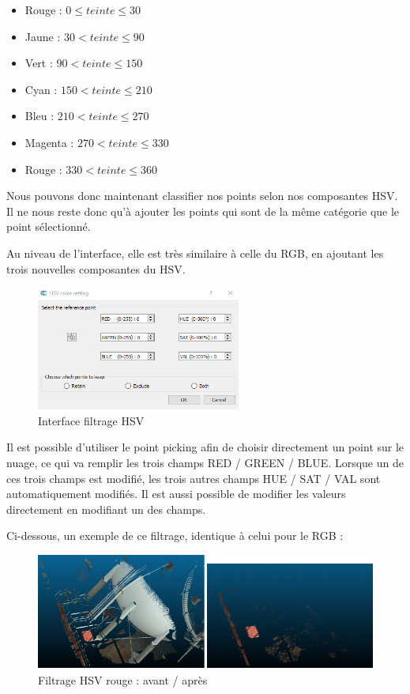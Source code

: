 \documentclass[12pt,titlepage,french]{article}
\begin{document}
\begin{itemize}
    \item Rouge : $0 \leq teinte \leq 30$
    \item Jaune : $30 < teinte \leq 90$
    \item Vert : $90 < teinte \leq 150$
    \item Cyan : $150 < teinte \leq 210$
    \item Bleu : $210 < teinte \leq 270$
    \item Magenta : $270 < teinte \leq 330$
    \item Rouge : $330 < teinte \leq 360$ \newline
\end{itemize}

Nous pouvons donc maintenant classifier nos points selon nos composantes HSV. Il ne nous reste donc qu'à ajouter les points qui sont de la même catégorie que le point sélectionné. \newline

Au niveau de l'interface, elle est très similaire à celle du RGB, en ajoutant les trois nouvelles composantes du HSV.

\begin{figure}[H]
\center \includegraphics[width=0.6\textwidth]{./img/ui_filter_hsv.PNG}
  \caption{\label{} Interface filtrage HSV}
\end{figure}

Il est possible d'utiliser le point picking afin de choisir directement un point sur le nuage, ce qui va remplir les trois champs RED / GREEN / BLUE. Lorsque un de ces trois champs est modifié, les trois autres champs HUE / SAT / VAL sont automatiquement modifiés. Il est aussi possible de modifier les valeurs directement en modifiant un des champs.

Ci-dessous, un exemple de ce filtrage, identique à celui pour le RGB :

\begin{figure}[H]
\center
\includegraphics[width=1\textwidth]{./img/hsv_avant_apres.PNG}
\caption{\label{} Filtrage HSV rouge : avant / après}
\end{figure}
\end{document}

